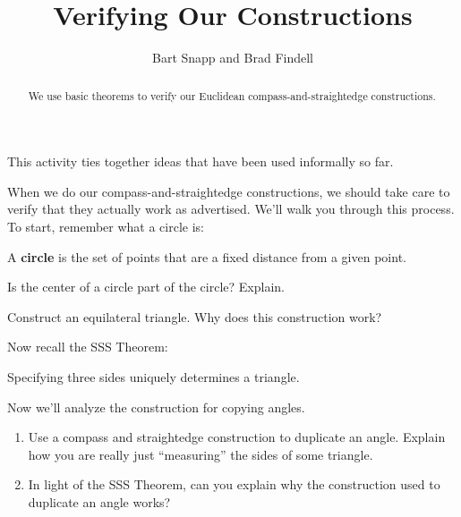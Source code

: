 \documentclass[nooutcomes]{ximera}
\title{Verifying Our Constructions}
\author{Bart Snapp and Brad Findell}
\begin{document}
\begin{abstract}
  We use basic theorems to verify our Euclidean compass-and-straightedge constructions.
\end{abstract}
\maketitle

\begin{teachingnote}
This activity ties together ideas that have been used informally so far.  
\end{teachingnote}

When we do our compass-and-straightedge constructions, we should take
care to verify that they actually work as advertised. We'll walk you
through this process. To start, remember what a circle is:

\begin{definition} 
A \textbf{circle} is the set of points that are a fixed distance from
a given point.
\end{definition}

\begin{problem} Is the center of a circle part of the circle? Explain.
\vspace{1in}
\end{problem}

\begin{problem} 
Construct an equilateral triangle.  Why does this construction work?
\vfill
\end{problem}


\newpage

Now recall the SSS Theorem:

\begin{theorem}[SSS] 
Specifying three sides uniquely determines a triangle.
\end{theorem}



\begin{problem} Now we'll analyze the construction for copying angles. 
\begin{enumerate}
\item Use a compass and straightedge construction to duplicate an
  angle. Explain how you are really just ``measuring'' the sides of
  some triangle.
\item In light of the SSS Theorem, can you explain why the
  construction used to duplicate an angle works?
\end{enumerate}
\vfill
\end{problem}
\end{document}
